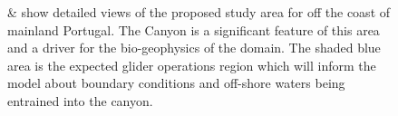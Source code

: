 \begin{figure}[!b]
  \vspace{-0.5cm} 
  \centering 
  \hspace{+0.3cm} 
  \caption{ \&  show detailed
    views of the proposed study area for \proje off the coast of
    mainland Portugal. The \naz Canyon is a significant feature of
    this area and a driver for the bio-geophysics of the domain. The
    shaded blue area is the expected glider operations region which
    will inform the model about boundary conditions and off-shore
    waters being entrained into the canyon.}
  \label{fig:studyarea-1}
\end{figure}

